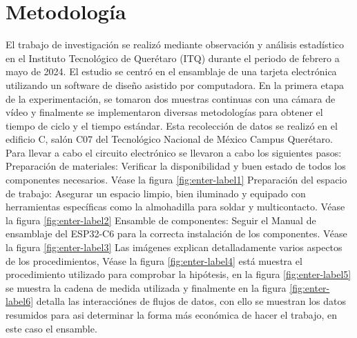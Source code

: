     \section{Metodología}
    El trabajo de investigación se realizó mediante observación y análisis estadístico en el Instituto Tecnológico de Querétaro (ITQ) durante el periodo de febrero a mayo de 2024. El estudio se centró en el ensamblaje de una tarjeta electrónica utilizando un software de diseño asistido por computadora. En la primera etapa de la experimentación, se tomaron dos muestras continuas con una cámara de vídeo y finalmente se implementaron diversas metodologías para obtener el tiempo de ciclo y el tiempo estándar. Esta recolección de datos se realizó en el edificio C, salón C07 del Tecnológico Nacional de México Campus Querétaro. 
    Para llevar a cabo el circuito electrónico se llevaron a cabo los siguientes pasos: Preparación de materiales: Verificar la disponibilidad y buen estado de todos los componentes necesarios. Véase la figura \ref{fig:enter-label1} Preparación del espacio de trabajo: Asegurar un espacio limpio, bien iluminado y equipado con herramientas específicas como la almohadilla para soldar y multicontacto. Véase la figura \ref{fig:enter-label2} Ensamble de componentes: Seguir el Manual de ensamblaje del ESP32-C6 para la correcta instalación de los componentes. Véase la figura \ref{fig:enter-label3}
    Las imágenes explican detalladamente varios aspectos de los procedimientos, Véase la figura \ref{fig:enter-label4} está muestra el procedimiento utilizado para comprobar la hipótesis, en la figura \ref{fig:enter-label5} se muestra la cadena de medida utilizada y finalmente en la figura \ref{fig:enter-label6} detalla las interacciónes de flujos de datos, con ello se muestran los datos resumidos para asi determinar la forma más económica de hacer el trabajo, en este caso el ensamble.
    
